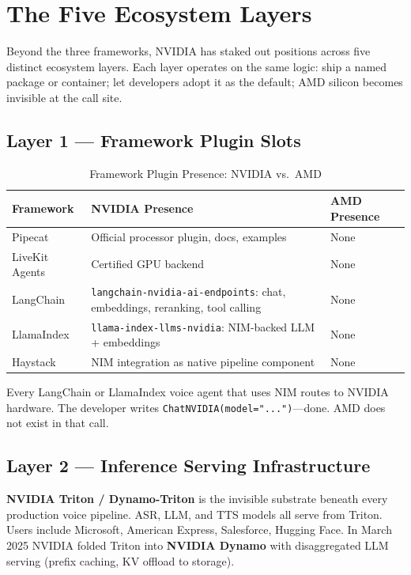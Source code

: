 \documentclass[12pt,a4paper]{article}
\begin{document}
\section{The Five Ecosystem Layers}
\label{sec:ecosystem}

Beyond the three frameworks, NVIDIA has staked out positions across five
distinct ecosystem layers.  Each layer operates on the same logic: ship a
named package or container; let developers adopt it as the default; AMD
silicon becomes invisible at the call site.

\subsection{Layer 1 --- Framework Plugin Slots}

\begin{table}[H]\centering
\caption{Framework Plugin Presence: NVIDIA vs.\ AMD}
\label{tab:plugins}
\begin{tabularx}{\textwidth}{lXX}
\toprule
\textbf{Framework} & \textbf{NVIDIA Presence} & \textbf{AMD Presence} \\
\midrule
Pipecat         & Official processor plugin, docs, examples & None \\
LiveKit Agents  & Certified GPU backend                     & None \\
LangChain       & \texttt{langchain-nvidia-ai-endpoints}: chat, embeddings, reranking, tool calling & None \\
LlamaIndex      & \texttt{llama-index-llms-nvidia}: NIM-backed LLM + embeddings & None \\
Haystack        & NIM integration as native pipeline component & None \\
\bottomrule
\end{tabularx}
\end{table}

Every LangChain or LlamaIndex voice agent that uses NIM routes to NVIDIA
hardware.  The developer writes \texttt{ChatNVIDIA(model="...")}---done.
AMD does not exist in that call.

\subsection{Layer 2 --- Inference Serving Infrastructure}

\textbf{NVIDIA Triton / Dynamo-Triton} is the invisible substrate beneath
every production voice pipeline.  ASR, LLM, and TTS models all serve from
Triton.  Users include Microsoft, American Express, Salesforce, Hugging
Face.  In March 2025 NVIDIA folded Triton into \textbf{NVIDIA Dynamo} with
disaggregated LLM serving (prefix caching, KV offload to storage).
\end{document}
